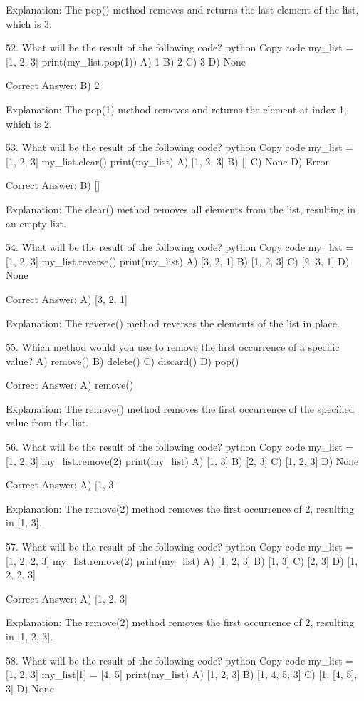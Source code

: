 Explanation:
The pop() method removes and returns the last element of the list, which is 3.

52. What will be the result of the following code?
python
Copy code
my_list = [1, 2, 3]
print(my_list.pop(1))
A) 1
B) 2
C) 3
D) None

Correct Answer: B) 2

Explanation:
The pop(1) method removes and returns the element at index 1, which is 2.

53. What will be the result of the following code?
python
Copy code
my_list = [1, 2, 3]
my_list.clear()
print(my_list)
A) [1, 2, 3]
B) []
C) None
D) Error

Correct Answer: B) []

Explanation:
The clear() method removes all elements from the list, resulting in an empty list.

54. What will be the result of the following code?
python
Copy code
my_list = [1, 2, 3]
my_list.reverse()
print(my_list)
A) [3, 2, 1]
B) [1, 2, 3]
C) [2, 3, 1]
D) None

Correct Answer: A) [3, 2, 1]

Explanation:
The reverse() method reverses the elements of the list in place.

55. Which method would you use to remove the first occurrence of a specific value?
A) remove()
B) delete()
C) discard()
D) pop()

Correct Answer: A) remove()

Explanation:
The remove() method removes the first occurrence of the specified value from the list.

56. What will be the result of the following code?
python
Copy code
my_list = [1, 2, 3]
my_list.remove(2)
print(my_list)
A) [1, 3]
B) [2, 3]
C) [1, 2, 3]
D) None

Correct Answer: A) [1, 3]

Explanation:
The remove(2) method removes the first occurrence of 2, resulting in [1, 3].

57. What will be the result of the following code?
python
Copy code
my_list = [1, 2, 2, 3]
my_list.remove(2)
print(my_list)
A) [1, 2, 3]
B) [1, 3]
C) [2, 3]
D) [1, 2, 2, 3]

Correct Answer: A) [1, 2, 3]

Explanation:
The remove(2) method removes the first occurrence of 2, resulting in [1, 2, 3].

58. What will be the result of the following code?
python
Copy code
my_list = [1, 2, 3]
my_list[1] = [4, 5]
print(my_list)
A) [1, 2, 3]
B) [1, 4, 5, 3]
C) [1, [4, 5], 3]
D) None

